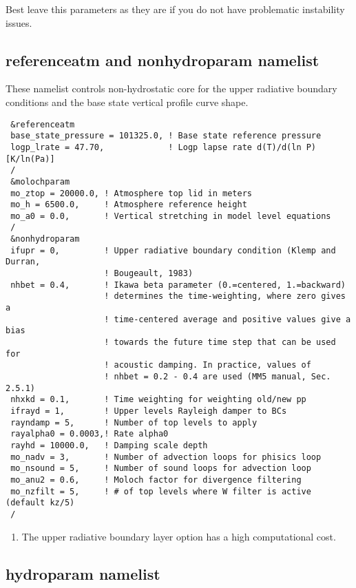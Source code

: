 Best leave this parameters as they are if you do not have problematic
instability issues.

\subsection{referenceatm and nonhydroparam namelist}

These namelist controls non-hydrostatic core for the upper radiative boundary
conditions and the base state vertical profile curve shape.

{\footnotesize
\begin{Verbatim}
 &referenceatm
 base_state_pressure = 101325.0, ! Base state reference pressure
 logp_lrate = 47.70,             ! Logp lapse rate d(T)/d(ln P) [K/ln(Pa)]
 /
 &molochparam
 mo_ztop = 20000.0, ! Atmosphere top lid in meters
 mo_h = 6500.0,     ! Atmosphere reference height
 mo_a0 = 0.0,       ! Vertical stretching in model level equations
 /
 &nonhydroparam
 ifupr = 0,         ! Upper radiative boundary condition (Klemp and Durran,
                    ! Bougeault, 1983)
 nhbet = 0.4,       ! Ikawa beta parameter (0.=centered, 1.=backward)
                    ! determines the time-weighting, where zero gives a
                    ! time-centered average and positive values give a bias
                    ! towards the future time step that can be used for
                    ! acoustic damping. In practice, values of
                    ! nhbet = 0.2 - 0.4 are used (MM5 manual, Sec. 2.5.1)
 nhxkd = 0.1,       ! Time weighting for weighting old/new pp
 ifrayd = 1,        ! Upper levels Rayleigh damper to BCs
 rayndamp = 5,      ! Number of top levels to apply
 rayalpha0 = 0.0003,! Rate alpha0
 rayhd = 10000.0,   ! Damping scale depth
 mo_nadv = 3,       ! Number of advection loops for phisics loop
 mo_nsound = 5,     ! Number of sound loops for advection loop
 mo_anu2 = 0.6,     ! Moloch factor for divergence filtering
 mo_nzfilt = 5,     ! # of top levels where W filter is active (default kz/5)
 /
\end{Verbatim}
}

\begin{enumerate}
\item The upper radiative boundary layer option has a high computational cost.
\end{enumerate}

\subsection{hydroparam namelist}

